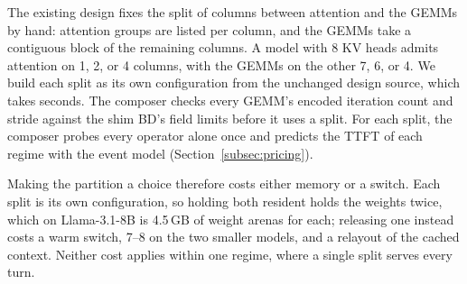 The existing design fixes the split of columns between attention and the GEMMs by hand: attention groups are listed per column, and the GEMMs take a contiguous block of the remaining columns.
A model with 8 KV heads admits attention on 1, 2, or 4 columns, with the GEMMs on the other 7, 6, or 4.
We build each split as its own configuration from the unchanged design source, which takes seconds.
The composer checks every GEMM's encoded iteration count and stride against the shim BD's field limits before it uses a split.
For each split, the composer probes every operator alone once and predicts the TTFT of each regime with the event model (Section~\ref{subsec:pricing}).

Making the partition a choice therefore costs either memory or a switch.
Each split is its own configuration, so holding both resident holds the weights twice, which on Llama-3.1-8B is 4.5\,GB of weight arenas for each; releasing one instead costs a warm switch, 7--8\ms{} on the two smaller models, and a relayout of the cached context.
Neither cost applies within one regime, where a single split serves every turn.

